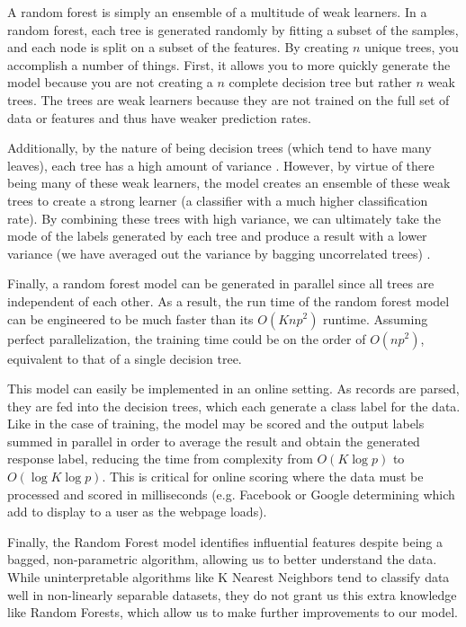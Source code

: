 \documentclass{article} %
\begin{document}
A random forest is simply an ensemble of a multitude of weak learners. In a random forest, each tree is generated randomly by fitting a subset of the samples, and each node is split on a subset of the features. By creating $n$ unique trees, you accomplish a number of things. First, it allows you to more quickly generate the model because you are not creating a $n$ complete decision tree but rather $n$ weak trees. The trees are weak learners because they are not trained on the full set of data or features and thus have weaker prediction rates.

Additionally, by the nature of being decision trees (which tend to have many leaves), each tree has a high amount of variance \cite{mlapp}. However, by virtue of there being many of these weak learners, the model creates an ensemble of these weak trees to create a strong learner (a classifier with a much higher classification rate). By combining these trees with high variance, we can ultimately take the mode of the labels generated by each tree and produce a result with a lower variance (we have averaged out the variance by bagging uncorrelated trees) \cite{stan}.

Finally, a random forest model can be generated in parallel since all trees are independent of each other. As a result, the run time of the random forest model can be engineered to be much faster than its $O(Knp^2)$ runtime. Assuming perfect parallelization, the training time could be on the order of $O(np^2)$, equivalent to that of a single decision tree.

This model can easily be implemented in an online setting. As records are parsed, they are fed into the decision trees, which each generate a class label for the data. Like in the case of training, the model may be scored and the output labels summed in parallel in order to average the result and obtain the generated response label, reducing the time from complexity from $O(K \log p)$ to $O(\log K \log p)$. This is critical for online scoring where the data must be processed and scored in milliseconds (e.g. Facebook or Google determining which add to display to a user as the webpage loads).

Finally, the Random Forest model identifies influential features despite being a bagged, non-parametric algorithm, allowing us to better understand the data. While uninterpretable algorithms like K Nearest Neighbors tend to classify data well in non-linearly separable datasets, they do not grant us this extra knowledge like Random Forests, which allow us to make further improvements to our model.
\end{document}
